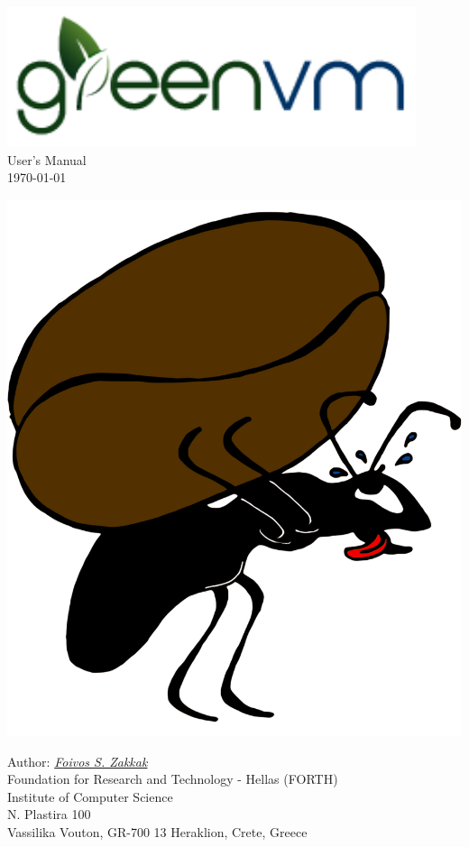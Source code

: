 \documentclass[
a4paper,
12pt,
]{report}
\begin{document}
\begin{titlepage}
\begin{center}

\href{http://www.ics.forth.gr/carv/greenvm}{\includegraphics[width=.5\linewidth]{greenvm}}\\
\LARGE User's Manual\\[0.5cm]
\large \today

\vfill

\includegraphics[width=.5\linewidth]{myrmigki_color}\\

\vfill

\large Author: \href{mailto:zakkak@ics.forth.gr}{\textit{Foivos S. Zakkak}}\\[1cm]

Foundation for Research and Technology - Hellas (FORTH)\\
Institute of Computer Science\\
N. Plastira 100\\
Vassilika Vouton, GR-700 13 Heraklion, Crete, Greece\\[0.5cm]

\end{center}

\end{titlepage}

\end{document}
